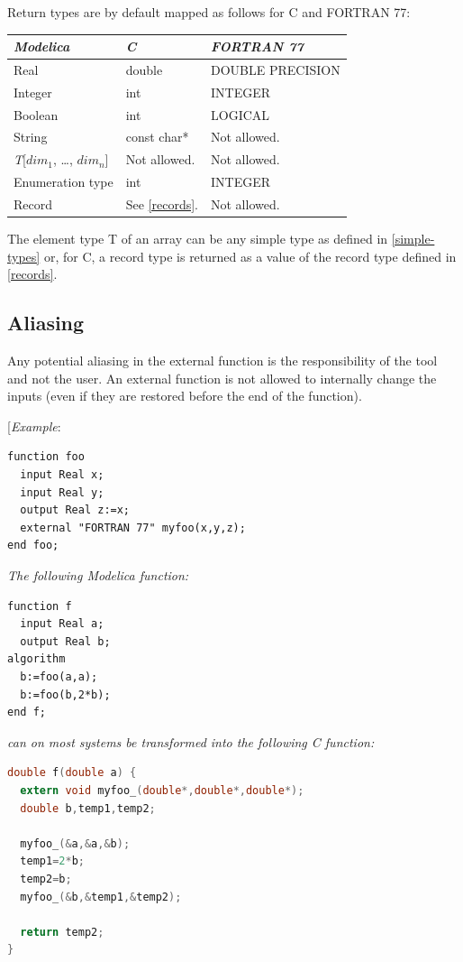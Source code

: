 \documentclass[10pt,a4paper]{report}
\def\doublelabel#1{\label{#1}\hypertarget{#1}{}}
\begin{document}
Return types are by default mapped as follows for C and FORTRAN 77:

\begin{longtable}[]{|l|l|l|}
\hline
\emph{Modelica} & \emph{C} & \emph{FORTRAN 77}\\ \hline
\endhead
Real & double & DOUBLE PRECISION\\ \hline
Integer & int & INTEGER\\ \hline
Boolean & int & LOGICAL\\ \hline
String & const char* & Not allowed.\\ \hline
\emph{T}{[}$\textit{dim}_1$, \ldots{},
$\textit{dim}_{n}${]} & Not allowed. & Not
allowed.\\ \hline
Enumeration type & int & INTEGER\\ \hline
Record & See \ref{records}. & Not allowed.\\ \hline
\end{longtable}

The element type T of an array can be any simple type as defined in
\ref{simple-types} or, for C, a record type is returned as a value of the
record type defined in \ref{records}.

\subsection{Aliasing}\doublelabel{aliasing}

Any potential aliasing in the external function is the responsibility of
the tool and not the user. An external function is not allowed to
internally change the inputs (even if they are restored before the end
of the function).

{[}\emph{Example}:

\begin{lstlisting}[language=modelica]
function foo
  input Real x;
  input Real y;
  output Real z:=x;
  external "FORTRAN 77" myfoo(x,y,z);
end foo;
\end{lstlisting}
\emph{The following Modelica function:}

\begin{lstlisting}[language=modelica]
function f
  input Real a;
  output Real b;
algorithm
  b:=foo(a,a);
  b:=foo(b,2*b);
end f;
\end{lstlisting}
\emph{can on most systems be transformed into the following C function:}
\begin{lstlisting}[language=C]
double f(double a) {
  extern void myfoo_(double*,double*,double*);
  double b,temp1,temp2;

  myfoo_(&a,&a,&b);
  temp1=2*b;
  temp2=b;
  myfoo_(&b,&temp1,&temp2);

  return temp2;
}
\end{lstlisting}
\end{document}
